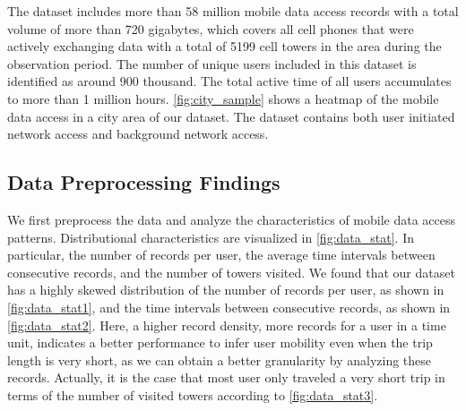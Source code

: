 The dataset includes more than 58 million mobile data access records with a total volume of more than 720 gigabytes, which covers all cell phones that were actively exchanging data with a total of 5199 cell towers in the area during the observation period. 
The number of unique users included in this dataset is identified as around 900 thousand. %
The total active time of all users accumulates to more than 1 million hours. 
\autoref{fig:city_sample} shows a heatmap of the mobile data access in a city area of our dataset.
The dataset contains both user initiated network access and background network access.

\subsection{Data Preprocessing Findings}

We first preprocess the data and analyze the characteristics of mobile data access patterns.  %
Distributional characteristics are visualized in \autoref{fig:data_stat}.
In particular,
the number of records per user,
the average time intervals between consecutive records, and
the number of towers visited.
We found that our dataset has a highly skewed distribution of
the number of records per user, as shown in \autoref{fig:data_stat1}, and
the time intervals between consecutive records, as shown in \autoref{fig:data_stat2}.
Here, a higher record density, \ie more records for a user in a time unit, indicates a better performance to infer user mobility even when the trip length is very short,
as we can obtain a better granularity by analyzing these records.
Actually, it is the case that most user only traveled a very short trip in terms of the number of visited towers according to \autoref{fig:data_stat3}.

